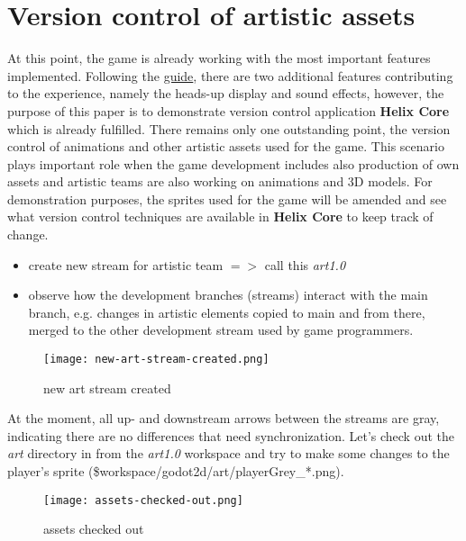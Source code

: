 \section{Version control of artistic assets} \label{case-study-2}
At this point, the game is already working with the most important features implemented. Following the 
\href{https://docs.godotengine.org/en/stable/getting_started/first_2d_game/06.heads_up_display.html}{\color{blue}guide},
there are two additional features contributing to the experience, namely the heads-up display and sound effects, however,
the purpose of this paper is to demonstrate version control application \textbf{Helix Core}\textsuperscript{\texttrademark}
which is already fulfilled. There remains only one outstanding point, the version control of animations and other artistic
assets used for the game. This scenario plays important role when the game development includes also production of own
assets and artistic teams are also working on animations and 3D models. \hfill \break
For demonstration purposes, the sprites used for the game will be amended and see what version control techniques are 
available in \textbf{Helix Core}\textsuperscript{\texttrademark} to keep track of change.
\begin{itemize}
    \item create new stream for artistic team {$=>$} call this \textit{art1.0}
    \item observe how the development branches (streams) interact with the main branch, e.g. changes in artistic elements
    copied to main and from there, merged to the other development stream used by game programmers.
\end{itemize}
\begin{figure}[H]
    \centering
    \texttt{[image: new-art-stream-created.png]}
    \setlength{\belowcaptionskip}{-10pt}
    \caption{new art stream created}
    \label{fig:new-art-stream-created}
\end{figure}
At the moment, all up- and downstream arrows between the streams are gray, indicating there are no differences that need
synchronization. Let's check out the \textit{art} directory in from the \textit{art1.0} workspace and try to make some
changes to the player's sprite \hfill \break (\$workspace/godot2d/art/playerGrey\_*.png). %
\begin{figure}[H]
    \centering
    \texttt{[image: assets-checked-out.png]}
    \setlength{\belowcaptionskip}{-10pt}
    \caption{assets checked out}
    \label{fig:assets-checked-out}
\end{figure}
